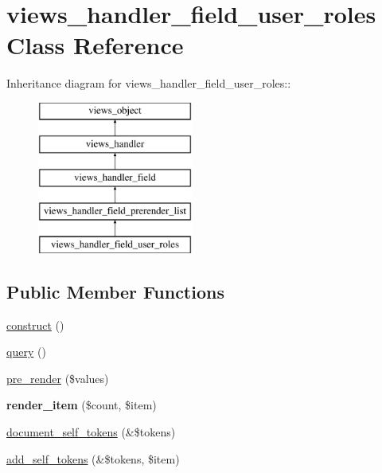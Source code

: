 \hypertarget{classviews__handler__field__user__roles}{
\section{views\_\-handler\_\-field\_\-user\_\-roles Class Reference}
\label{classviews__handler__field__user__roles}
}
Inheritance diagram for views\_\-handler\_\-field\_\-user\_\-roles::\begin{figure}[H]
\begin{center}
\leavevmode
\includegraphics[height=5cm]{classviews__handler__field__user__roles}
\end{center}
\end{figure}
\subsection*{Public Member Functions}
\begin{CompactItemize}
\item 
\hyperlink{classviews__handler__field__user__roles_bf8254566ae390355b35d4593514b033}{construct} ()
\item 
\hyperlink{classviews__handler__field__user__roles_26513786d88b63b1e2dcfd4aa09c4552}{query} ()
\item 
\hyperlink{classviews__handler__field__user__roles_342d1bffbb0098a432ace0f838c63989}{pre\_\-render} (\$values)
\item 
\hypertarget{classviews__handler__field__user__roles_ea8e9006d630d4efe5d05f38cca151d2}{
\textbf{render\_\-item} (\$count, \$item)}
\label{classviews__handler__field__user__roles_ea8e9006d630d4efe5d05f38cca151d2}

\item 
\hyperlink{classviews__handler__field__user__roles_49745a7c1d16f9ee62d5ad6406fe0863}{document\_\-self\_\-tokens} (\&\$tokens)
\item 
\hyperlink{classviews__handler__field__user__roles_ceb9ebe1ca046eec3634c85bb6b114f5}{add\_\-self\_\-tokens} (\&\$tokens, \$item)
\end{CompactItemize}


